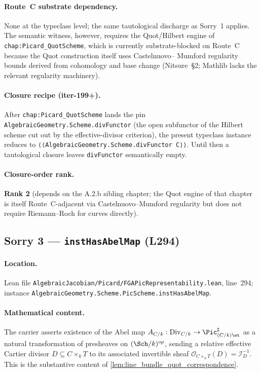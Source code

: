 \paragraph{Route~C substrate dependency.} None at the typeclass
level; the same tautological discharge as Sorry~1 applies. The
semantic witness, however, requires the Quot/Hilbert engine of
\texttt{chap:Picard\_QuotScheme}, which is currently substrate-blocked
on Route~C because the Quot construction itself uses Castelnuovo--
Mumford regularity bounds derived from cohomology and base change
(Nitsure~\S2; Mathlib lacks the relevant regularity machinery).

\paragraph{Closure recipe (iter-199+).} After
\texttt{chap:Picard\_QuotScheme} lands the pin
\texttt{AlgebraicGeometry.Scheme.divFunctor} (the open subfunctor of
the Hilbert scheme cut out by the effective-divisor criterion), the
present typeclass instance reduces to
\texttt{⟨⟨AlgebraicGeometry.Scheme.divFunctor C⟩⟩}. Until then a
tautological closure leaves \texttt{divFunctor} semantically empty.

\paragraph{Closure-order rank.} \textbf{Rank 2} (depends on the
A.2.b sibling chapter; the Quot engine of that chapter is itself
Route~C-adjacent via Castelnuovo--Mumford regularity but does not
require Riemann--Roch for curves directly).

\subsection{Sorry 3 --- \texttt{instHasAbelMap} (L294)}
\label{subsec:sorry_has_abel_map}

\paragraph{Location.} Lean file
\texttt{AlgebraicJacobian/Picard/FGAPicRepresentability.lean},
line~294; instance
\texttt{AlgebraicGeometry.Scheme.PicScheme.instHasAbelMap}.

\paragraph{Mathematical content.} The carrier asserts existence of
the Abel map
$A_{C/k} : \mathrm{Div}_{C/k} \to \Pic^\sharp_{(C/k)\et}$ as a natural
transformation of presheaves on $(\Sch/k)^{op}$, sending a relative
effective Cartier divisor $D \subseteq C \times_k T$ to its associated
invertible sheaf $\mathcal{O}_{C \times_k T}(D) = \mathcal{I}_D^{-1}$.
This is the substantive content of
\cref{lem:line_bundle_quot_correspondence}.

